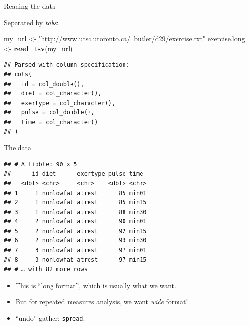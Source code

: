\documentclass[ignorenonframetext,]{beamer}
\newenvironment{Shaded}{\begin{snugshade}}{\end{snugshade}}
\newcommand{\DataTypeTok}[1]{\textcolor[rgb]{0.13,0.29,0.53}{#1}}
\newcommand{\DecValTok}[1]{\textcolor[rgb]{0.00,0.00,0.81}{#1}}
\newcommand{\KeywordTok}[1]{\textcolor[rgb]{0.13,0.29,0.53}{\textbf{#1}}}
\newcommand{\NormalTok}[1]{#1}
\newcommand{\OperatorTok}[1]{\textcolor[rgb]{0.81,0.36,0.00}{\textbf{#1}}}
\newcommand{\StringTok}[1]{\textcolor[rgb]{0.31,0.60,0.02}{#1}}
\begin{document}
\begin{frame}[fragile]{Reading the data}
\protect\hypertarget{reading-the-data-1}{}

Separated by \emph{tabs}:

\begin{Shaded}
\begin{Highlighting}[]
\NormalTok{my_url <-}\StringTok{ "http://www.utsc.utoronto.ca/~butler/d29/exercise.txt"}
\NormalTok{exercise.long <-}\StringTok{ }\KeywordTok{read_tsv}\NormalTok{(my_url)}
\end{Highlighting}
\end{Shaded}

\begin{verbatim}
## Parsed with column specification:
## cols(
##   id = col_double(),
##   diet = col_character(),
##   exertype = col_character(),
##   pulse = col_double(),
##   time = col_character()
## )
\end{verbatim}

\end{frame}

\begin{frame}[fragile]{The data}
\protect\hypertarget{the-data-10}{}

\begin{Shaded}
\end{Shaded}

\begin{verbatim}
## # A tibble: 90 x 5
##      id diet      exertype pulse time 
##   <dbl> <chr>     <chr>    <dbl> <chr>
## 1     1 nonlowfat atrest      85 min01
## 2     1 nonlowfat atrest      85 min15
## 3     1 nonlowfat atrest      88 min30
## 4     2 nonlowfat atrest      90 min01
## 5     2 nonlowfat atrest      92 min15
## 6     2 nonlowfat atrest      93 min30
## 7     3 nonlowfat atrest      97 min01
## 8     3 nonlowfat atrest      97 min15
## # … with 82 more rows
\end{verbatim}

\begin{itemize}
\item
  This is ``long format'', which is usually what we want.
\item
  But for repeated measures analysis, we want \emph{wide} format!
\item
  ``undo'' gather: \texttt{spread}.
\end{itemize}

\end{frame}
\end{document}
